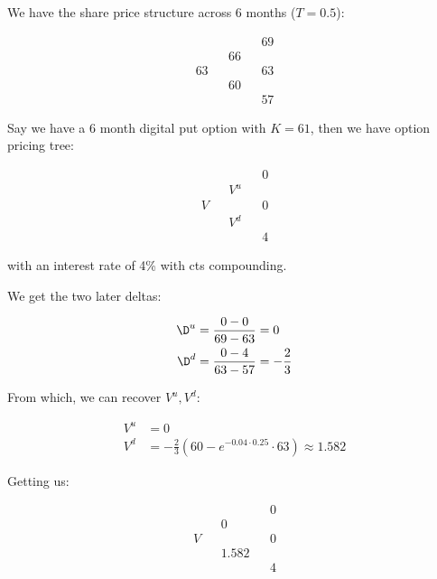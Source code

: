 \documentclass{article}
\begin{document}
	We have the share price structure across 6 months ($T = 0.5$):
	
	\begin{equation*}
		\begin{array}{ccccc}
			   &   &    &   & 69 \\
			   &   & 66 &   & \\
			63 &   &    &   & 63 \\
			   &   & 60 &   & \\
			   &   &    &   & 57
		\end{array}
	\end{equation*}
	
	
	Say we have a 6 month digital put option with $K=61$, then we have option pricing tree:
	
	\begin{equation*}
		\begin{array}{ccccc}
			&   &     &   & 0 \\
			&   & V^u &   & \\
		V   &   &     &   & 0 \\
			&   & V^d &   & \\
			&   &     &   & 4
		\end{array}
	\end{equation*}
	
	with an interest rate of 4\% with cts compounding.
	
	We get the two later deltas:
	
	\begin{align*}
		\D^u &= \frac{0 - 0}{69 - 63} = 0 \\
		\D^d &= \frac{0 - 4}{63 - 57} = -\frac{2}{3}
	\end{align*}
	
	From which, we can recover $V^u, V^d$:
	
	
	\begin{align*}
		V^u &= 0 \\
		V^d &= -\frac{2}{3} (60 - e^{-0.04 \cdot 0.25}\cdot 63) \approx 1.582
	\end{align*}
	
	Getting us:
	
	\begin{equation*}
		\begin{array}{ccccc}
			&   &       &   & 0 \\
			&   & 0     &   & \\
		V   &   &       &   & 0 \\
			&   & 1.582 &   & \\
			&   &       &   & 4
		\end{array}
	\end{equation*}
	
\end{document}
